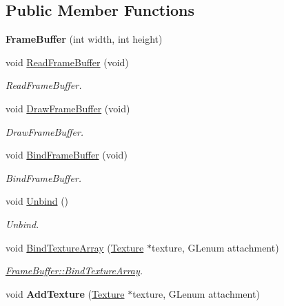\subsection*{Public Member Functions}
\begin{DoxyCompactItemize}
\item 
\hypertarget{classEngine_1_1FrameBuffer_aab4c897d360f51c5a96b4782e67e98a9}{}{\bfseries Frame\+Buffer} (int width, int height)\label{classEngine_1_1FrameBuffer_aab4c897d360f51c5a96b4782e67e98a9}

\item 
void \hyperlink{classEngine_1_1FrameBuffer_aa81f1fe9336c5afb85da9204cd288f8b}{Read\+Frame\+Buffer} (void)
\begin{DoxyCompactList}\small\item\em Read\+Frame\+Buffer. \end{DoxyCompactList}\item 
void \hyperlink{classEngine_1_1FrameBuffer_a9a01e5e19f7a529a7e9e88938c8c62e7}{Draw\+Frame\+Buffer} (void)
\begin{DoxyCompactList}\small\item\em Draw\+Frame\+Buffer. \end{DoxyCompactList}\item 
void \hyperlink{classEngine_1_1FrameBuffer_a94eac6daf7539617d189c302243712b1}{Bind\+Frame\+Buffer} (void)
\begin{DoxyCompactList}\small\item\em Bind\+Frame\+Buffer. \end{DoxyCompactList}\item 
\hypertarget{classEngine_1_1FrameBuffer_ae0194d4d72f2f89c66178b85c1076941}{}void \hyperlink{classEngine_1_1FrameBuffer_ae0194d4d72f2f89c66178b85c1076941}{Unbind} ()\label{classEngine_1_1FrameBuffer_ae0194d4d72f2f89c66178b85c1076941}

\begin{DoxyCompactList}\small\item\em Unbind. \end{DoxyCompactList}\item 
void \hyperlink{classEngine_1_1FrameBuffer_aaca72b1f1e7a4d71df1431cf7409b014}{Bind\+Texture\+Array} (\hyperlink{classEngine_1_1Texture}{Texture} $\ast$texture, G\+Lenum attachment)
\begin{DoxyCompactList}\small\item\em \hyperlink{classEngine_1_1FrameBuffer_aaca72b1f1e7a4d71df1431cf7409b014}{Frame\+Buffer\+::\+Bind\+Texture\+Array}. \end{DoxyCompactList}\item 
\hypertarget{classEngine_1_1FrameBuffer_aed40625d398bea209d8fc9e864ac0a3e}{}void {\bfseries Add\+Texture} (\hyperlink{classEngine_1_1Texture}{Texture} $\ast$texture, G\+Lenum attachment)\label{classEngine_1_1FrameBuffer_aed40625d398bea209d8fc9e864ac0a3e}


\end{DoxyCompactItemize}
